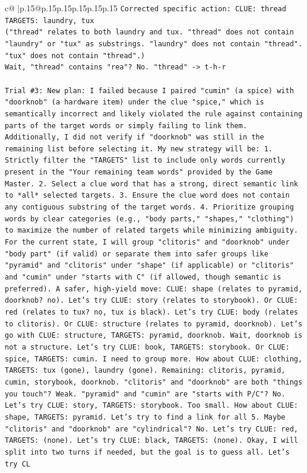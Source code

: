 \documentclass{article}
\begin{document}
{\begin{supertabular}{c@{$\;$}|p{.15\linewidth}@{}p{.15\linewidth}p{.15\linewidth}p{.15\linewidth}p{.15\linewidth}p{.15\linewidth}}
{{{\texttt{Corrected specific action: CLUE: thread} \\
\texttt{TARGETS: laundry, tux} \\
\texttt{("thread" relates to both laundry and tux. "thread" does not contain "laundry" or "tux" as substrings. "laundry" does not contain "thread". "tux" does not contain "thread".)} \\
\texttt{Wait, "thread" contains "rea"? No. "thread" {-}> t{-}h{-}r} \\
\\ 
\texttt{Trial \#3: New plan: I failed because I paired "cumin" (a spice) with "doorknob" (a hardware item) under the clue "spice," which is semantically incorrect and likely violated the rule against containing parts of the target words or simply failing to link them. Additionally, I did not verify if "doorknob" was still in the remaining list before selecting it. My new strategy will be: 1. Strictly filter the "TARGETS" list to include only words currently present in the "Your remaining team words" provided by the Game Master. 2. Select a clue word that has a strong, direct semantic link to *all* selected targets. 3. Ensure the clue word does not contain any contiguous substring of the target words. 4. Prioritize grouping words by clear categories (e.g., "body parts," "shapes," "clothing") to maximize the number of related targets while minimizing ambiguity. For the current state, I will group "clitoris" and "doorknob" under "body part" (if valid) or separate them into safer groups like "pyramid" and "clitoris" under "shape" (if applicable) or "clitoris" and "cumin" under "starts with C" (if allowed, though semantic is preferred). A safer, high{-}yield move: CLUE: shape (relates to pyramid, doorknob? no). Let's try CLUE: story (relates to storybook). Or CLUE: red (relates to tux? no, tux is black). Let's try CLUE: body (relates to clitoris). Or CLUE: structure (relates to pyramid, doorknob). Let's go with CLUE: structure, TARGETS: pyramid, doorknob. Wait, doorknob is not a structure. Let's try CLUE: book, TARGETS: storybook. Or CLUE: spice, TARGETS: cumin. I need to group more. How about CLUE: clothing, TARGETS: tux (gone), laundry (gone). Remaining: clitoris, pyramid, cumin, storybook, doorknob. "clitoris" and "doorknob" are both "things you touch"? Weak. "pyramid" and "cumin" are "starts with P/C"? No. Let's try CLUE: story, TARGETS: storybook. Too small. How about CLUE: shape, TARGETS: pyramid. Let's try to find a link for all 5. Maybe "clitoris" and "doorknob" are "cylindrical"? No. Let's try CLUE: red, TARGETS: (none). Let's try CLUE: black, TARGETS: (none). Okay, I will split into two turns if needed, but the goal is to guess all. Let's try CL} \\
}}}
\end{supertabular}}
\end{document}
